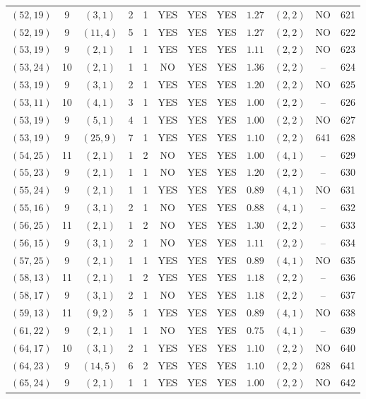 \begin{longtable}{|c|c|c|c|c|c|c|c|c|c|c|c|}
$(52,19)$ & 9 & $(3,1)$ & 2 & 1 & YES & YES & YES & $1.27$ & $(2,2)$ & NO & 621\\
$(52,19)$ & 9 & $(11,4)$ & 5 & 1 & YES & YES & YES & $1.27$ & $(2,2)$ & NO & 622\\
$(53,19)$ & 9 & $(2,1)$ & 1 & 1 & YES & YES & YES & $1.11$ & $(2,2)$ & NO & 623\\
$(53,24)$ & 10 & $(2,1)$ & 1 & 1 & NO & YES & YES & $1.36$ & $(2,2)$ & -- & 624\\
$(53,19)$ & 9 & $(3,1)$ & 2 & 1 & YES & YES & YES & $1.20$ & $(2,2)$ & NO & 625\\
$(53,11)$ & 10 & $(4,1)$ & 3 & 1 & YES & YES & YES & $1.00$ & $(2,2)$ & -- & 626\\
$(53,19)$ & 9 & $(5,1)$ & 4 & 1 & YES & YES & YES & $1.00$ & $(2,2)$ & NO & 627\\
$(53,19)$ & 9 & $(25,9)$ & 7 & 1 & YES & YES & YES & $1.10$ & $(2,2)$ & 641 & 628\\
$(54,25)$ & 11 & $(2,1)$ & 1 & 2 & NO & YES & YES & $1.00$ & $(4,1)$ & -- & 629\\
$(55,23)$ & 9 & $(2,1)$ & 1 & 1 & NO & YES & YES & $1.20$ & $(2,2)$ & -- & 630\\
$(55,24)$ & 9 & $(2,1)$ & 1 & 1 & YES & YES & YES & $0.89$ & $(4,1)$ & NO & 631\\
$(55,16)$ & 9 & $(3,1)$ & 2 & 1 & NO & YES & YES & $0.88$ & $(4,1)$ & -- & 632\\
$(56,25)$ & 11 & $(2,1)$ & 1 & 2 & NO & YES & YES & $1.30$ & $(2,2)$ & -- & 633\\
$(56,15)$ & 9 & $(3,1)$ & 2 & 1 & NO & YES & YES & $1.11$ & $(2,2)$ & -- & 634\\
$(57,25)$ & 9 & $(2,1)$ & 1 & 1 & YES & YES & YES & $0.89$ & $(4,1)$ & NO & 635\\
$(58,13)$ & 11 & $(2,1)$ & 1 & 2 & YES & YES & YES & $1.18$ & $(2,2)$ & -- & 636\\
$(58,17)$ & 9 & $(3,1)$ & 2 & 1 & NO & YES & YES & $1.18$ & $(2,2)$ & -- & 637\\
$(59,13)$ & 11 & $(9,2)$ & 5 & 1 & YES & YES & YES & $0.89$ & $(4,1)$ & NO & 638\\
$(61,22)$ & 9 & $(2,1)$ & 1 & 1 & NO & YES & YES & $0.75$ & $(4,1)$ & -- & 639\\
$(64,17)$ & 10 & $(3,1)$ & 2 & 1 & YES & YES & YES & $1.10$ & $(2,2)$ & NO & 640\\
$(64,23)$ & 9 & $(14,5)$ & 6 & 2 & YES & YES & YES & $1.10$ & $(2,2)$ & 628 & 641\\
$(65,24)$ & 9 & $(2,1)$ & 1 & 1 & YES & YES & YES & $1.00$ & $(2,2)$ & NO & 642\\

\end{longtable}
